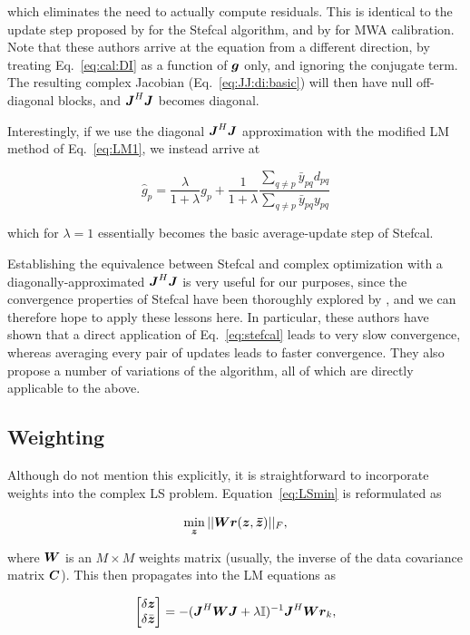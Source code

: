 \documentclass[useAMS,usenatbib]{mn2e}
\newcommand{\II}{\mathbb{I}}
\newcommand{\zz}{\bmath{z}}
\newcommand{\mat}[1]{{\bmath{#1}}}
\newcommand{\JJ}{\mat{J}} %
\begin{document}
which eliminates the need to actually compute residuals. This is identical to the update step proposed by \citet{Stefcal} for the 
Stefcal algorithm, and by \citet{Mitchell-RTS} for MWA calibration. Note that these authors arrive at the equation from a different 
direction, by treating Eq.~\ref{eq:cal:DI} as a function of $\bmath{g}$ only, and ignoring the conjugate term. The 
resulting complex Jacobian (Eq.~\ref{eq:JJ:di:basic}) will then have null off-diagonal blocks, and $\JJ^H\JJ$ becomes 
diagonal.

Interestingly, if we use the diagonal $\JJ^H\JJ$ approximation with the modified LM method of Eq.~\ref{eq:LM1}, we instead 
arrive at

\[
\hat{g}_p = \frac{\lambda}{1+\lambda}g_p + \frac{1}{1+\lambda} \frac{\sum\limits_{q\ne p} \bar{y}_{pq} d_{pq}}{
\sum\limits_{q\ne p} \bar{y}_{pq} y_{pq}}
\]

which for $\lambda=1$ essentially becomes the basic average-update step of Stefcal.

Establishing the equivalence between Stefcal and complex optimization with a diagonally-approximated $\JJ^H\JJ$ is 
very useful for our purposes, since the convergence properties of Stefcal have been thoroughly explored 
by \citet{Stefcal}, and we can therefore hope to apply these lessons here. In particular, these authors have shown 
that a direct application of Eq.~\ref{eq:stefcal} leads to very slow convergence, whereas averaging every pair of 
updates leads to faster convergence. They also propose a number of variations of the algorithm, all of which are 
directly applicable to the above.

\subsection{Weighting}
\label{sec:DI:W}

Although \citet{ComplexOpt} do not mention this explicitly, it is straightforward to incorporate weights into the 
complex LS problem. Equation~\ref{eq:LSmin} is reformulated as

\begin{equation}
\label{eq:LSmin:w}
\min_{\bmath{z}} ||\mat{W} \bmath{r}(\bmath{z},\bmath{\bar z})||_F,
\end{equation}

where $\mat{W}$ is an $M\times M$ weights matrix (usually, the inverse of the data covariance matrix $\mat{C}$). This then propagates into the 
LM equations as

\begin{equation}
\label{eq:LM:W}
\Matrix{c}{\delta \zz \\ \delta \bar{\zz}} = -(\JJ^H \mat{W} \JJ + \lambda\II)^{-1}\JJ^H \mat{W} \bmath{r}_k,
\end{equation}
\end{document}
